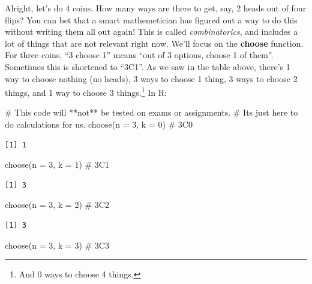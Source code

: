 \documentclass[
  letterpaper,
  DIV=11,
  numbers=noendperiod,
  oneside]{scrreprt}
\newenvironment{Shaded}{\begin{snugshade}}{\end{snugshade}}
\newcommand{\AttributeTok}[1]{\textcolor[rgb]{0.40,0.45,0.13}{#1}}
\newcommand{\CommentTok}[1]{\textcolor[rgb]{0.37,0.37,0.37}{#1}}
\newcommand{\DecValTok}[1]{\textcolor[rgb]{0.68,0.00,0.00}{#1}}
\newcommand{\FunctionTok}[1]{\textcolor[rgb]{0.28,0.35,0.67}{#1}}
\newcommand{\NormalTok}[1]{\textcolor[rgb]{0.00,0.23,0.31}{#1}}
\begin{document}
Alright, let's do 4 coins. How many ways are there to get, say, 2 heads
out of four flips? You can bet that a smart mathemetician has figured
out a way to do this without writing them all out again! This is called
\emph{combinatorics}, and includes a lot of things that are not relevant
right now. We'll focus on the \textbf{choose} function. For three coins,
``3 choose 1'' means ``out of 3 options, choose 1 of them''. Sometimes
this is shortened to ``3C1''. As we saw in the table above, there's 1
way to choose nothing (no heads), 3 ways to choose 1 thing, 3 ways to
choose 2 things, and 1 way to choose 3 things.\footnote{And 0 ways to
  choose 4 things.} In R:

\begin{Shaded}
\begin{Highlighting}[]
\CommentTok{\# This code will **not** be tested on exams or assignments.}
\CommentTok{\# It\textquotesingle{}s just here to do calculations for us.}
\FunctionTok{choose}\NormalTok{(}\AttributeTok{n =} \DecValTok{3}\NormalTok{, }\AttributeTok{k =} \DecValTok{0}\NormalTok{) }\CommentTok{\# 3C0}
\end{Highlighting}
\end{Shaded}

\begin{verbatim}
[1] 1
\end{verbatim}

\begin{Shaded}
\begin{Highlighting}[]
\FunctionTok{choose}\NormalTok{(}\AttributeTok{n =} \DecValTok{3}\NormalTok{, }\AttributeTok{k =} \DecValTok{1}\NormalTok{) }\CommentTok{\# 3C1}
\end{Highlighting}
\end{Shaded}

\begin{verbatim}
[1] 3
\end{verbatim}

\begin{Shaded}
\begin{Highlighting}[]
\FunctionTok{choose}\NormalTok{(}\AttributeTok{n =} \DecValTok{3}\NormalTok{, }\AttributeTok{k =} \DecValTok{2}\NormalTok{) }\CommentTok{\# 3C2}
\end{Highlighting}
\end{Shaded}

\begin{verbatim}
[1] 3
\end{verbatim}

\begin{Shaded}
\begin{Highlighting}[]
\FunctionTok{choose}\NormalTok{(}\AttributeTok{n =} \DecValTok{3}\NormalTok{, }\AttributeTok{k =} \DecValTok{3}\NormalTok{) }\CommentTok{\# 3C3}
\end{Highlighting}
\end{Shaded}
\end{document}
